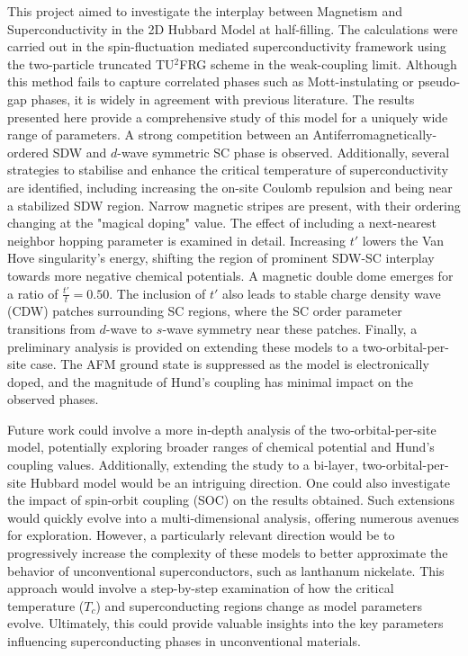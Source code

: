 \documentclass[11pt]{article}
\begin{document}
This project aimed to investigate the interplay between Magnetism and Superconductivity in the 2D Hubbard Model at half-filling. The calculations were carried out
in the spin-fluctuation mediated superconductivity framework using the two-particle truncated TU$^2$FRG scheme in the weak-coupling limit. Although this method
fails to capture correlated phases such as Mott-instulating or pseudo-gap phases, it is widely in agreement with previous literature. The results presented here provide
a comprehensive study of this model for a uniquely wide range of parameters. A strong competition between an
Antiferromagnetically-ordered SDW and $d$-wave symmetric SC phase is observed. 
Additionally, several strategies to stabilise and enhance the critical temperature of superconductivity are identified, including increasing the on-site Coulomb repulsion and being near a stabilized SDW region.
Narrow magnetic stripes are present, with their ordering changing at the "magical doping" value. The effect of including a next-nearest neighbor hopping parameter is examined in detail. Increasing $t'$ lowers the Van Hove singularity's energy, shifting the region of prominent SDW-SC interplay towards more negative chemical potentials.
A magnetic double dome emerges for a ratio of $\frac{t'}{t} = 0.50$.
The inclusion of $t'$ also leads to stable charge density wave (CDW) 
patches surrounding SC regions, where the SC order parameter transitions from $d$-wave to $s$-wave symmetry near these patches. 
Finally, a preliminary analysis is provided on extending these models to a 
two-orbital-per-site case. The AFM ground state is suppressed as the model is electronically doped, and the magnitude of Hund's 
coupling has minimal impact on the observed phases.\par


\medskip

\noindent Future work could involve a more in-depth analysis of the two-orbital-per-site model, potentially exploring broader ranges of 
chemical potential and Hund's coupling values. Additionally, extending the study to a bi-layer, two-orbital-per-site Hubbard model would be an intriguing direction. One could also investigate the 
impact of spin-orbit coupling (SOC) on the results obtained. Such extensions would quickly evolve into a multi-dimensional 
analysis, offering numerous avenues for exploration. However, a particularly relevant direction would be to progressively increase
the complexity of these models to better approximate the behavior of unconventional superconductors, 
such as lanthanum nickelate. This approach would involve a step-by-step examination of how the critical temperature ($T_c$) and superconducting 
regions change as model parameters evolve. Ultimately, this could provide valuable insights into the key parameters influencing superconducting 
phases in unconventional materials.
\end{document}
